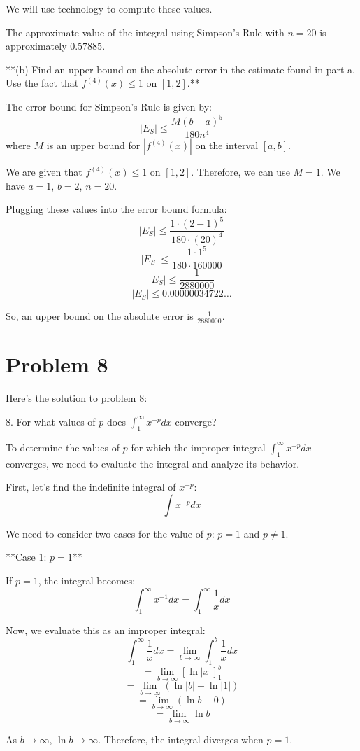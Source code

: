 \documentclass{article}
\begin{document}
We will use technology to compute these values.

The approximate value of the integral using Simpson's Rule with $n=20$ is approximately $0.57885$.

**(b) Find an upper bound on the absolute error in the estimate found in part a. Use the fact that $f^{(4)}(x) \leq 1$ on $[1, 2]$.**

The error bound for Simpson's Rule is given by:
$$ |E_S| \leq \frac{M(b-a)^5}{180n^4} $$
where $M$ is an upper bound for $|f^{(4)}(x)|$ on the interval $[a, b]$.

We are given that $f^{(4)}(x) \leq 1$ on $[1, 2]$. Therefore, we can use $M = 1$.
We have $a = 1$, $b = 2$, $n = 20$.

Plugging these values into the error bound formula:
$$ |E_S| \leq \frac{1 \cdot (2-1)^5}{180 \cdot (20)^4} $$
$$ |E_S| \leq \frac{1 \cdot 1^5}{180 \cdot 160000} $$
$$ |E_S| \leq \frac{1}{2880000} $$
$$ |E_S| \leq 0.00000034722\dots $$

So, an upper bound on the absolute error is $\frac{1}{2880000}$.

\newpage

\section*{Problem 8}
Here's the solution to problem 8:

8. For what values of $p$ does $\int_{1}^{\infty} x^{-p} dx$ converge?

To determine the values of $p$ for which the improper integral $\int_{1}^{\infty} x^{-p} dx$ converges, we need to evaluate the integral and analyze its behavior.

First, let's find the indefinite integral of $x^{-p}$:
$$ \int x^{-p} dx $$

We need to consider two cases for the value of $p$: $p=1$ and $p \neq 1$.

**Case 1: $p = 1$**

If $p = 1$, the integral becomes:
$$ \int_{1}^{\infty} x^{-1} dx = \int_{1}^{\infty} \frac{1}{x} dx $$

Now, we evaluate this as an improper integral:
$$ \int_{1}^{\infty} \frac{1}{x} dx = \lim_{b \to \infty} \int_{1}^{b} \frac{1}{x} dx $$
$$ = \lim_{b \to \infty} [\ln|x|]_{1}^{b} $$
$$ = \lim_{b \to \infty} (\ln|b| - \ln|1|) $$
$$ = \lim_{b \to \infty} (\ln b - 0) $$
$$ = \lim_{b \to \infty} \ln b $$

As $b \to \infty$, $\ln b \to \infty$. Therefore, the integral diverges when $p=1$.
\end{document}
